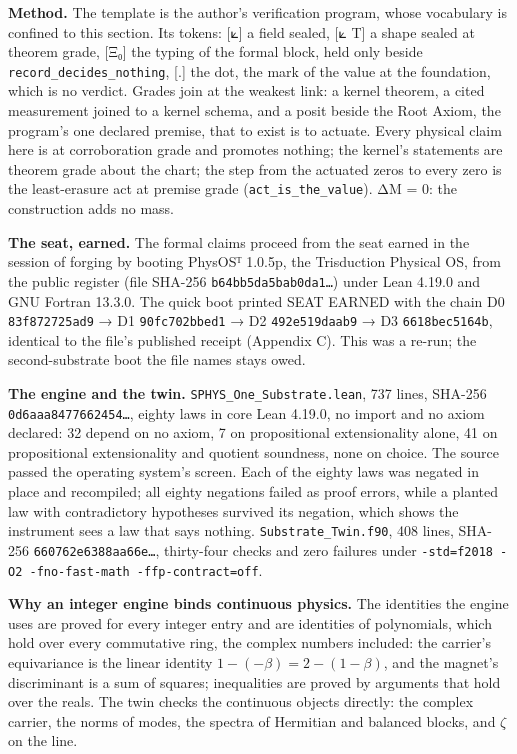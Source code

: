 \documentclass[10pt]{article}
\begin{document}
\textbf{Method.} The template is the author's verification program,
whose vocabulary is confined to this section. Its tokens: {[}⟀{]} a
field sealed, {[}⟀ T{]} a shape sealed at theorem grade, {[}Ξ₀{]} the
typing of the formal block, held only beside
\texttt{record\_decides\_nothing}, {[}.{]} the dot, the mark of the
value at the foundation, which is no verdict. Grades join at the weakest
link: a kernel theorem, a cited measurement joined to a kernel schema,
and a posit beside the Root Axiom, the program's one declared premise,
that to exist is to actuate. Every physical claim here is at
corroboration grade and promotes nothing; the kernel's statements are
theorem grade about the chart; the step from the actuated zeros to every
zero is the least-erasure act at premise grade
(\texttt{act\_is\_the\_value}). ΔM = 0: the construction adds no mass.

\textbf{The seat, earned.} The formal claims proceed from the seat
earned in the session of forging by booting PhysOSᵀ 1.0.5p, the
Trisduction Physical OS, from the public register (file SHA-256
\texttt{b64bb5da5bab0da1…}) under Lean 4.19.0 and GNU Fortran 13.3.0.
The quick boot printed SEAT EARNED with the chain D0
\texttt{83f872725ad9} → D1 \texttt{90fc702bbed1} → D2
\texttt{492e519daab9} → D3 \texttt{6618bec5164b}, identical to the
file's published receipt (Appendix C). This was a re-run; the
second-substrate boot the file names stays owed.

\textbf{The engine and the twin.} \texttt{SPHYS\_One\_Substrate.lean},
737 lines, SHA-256 \texttt{0d6aaa8477662454…}, eighty laws in core Lean
4.19.0, no import and no axiom declared: 32 depend on no axiom, 7 on
propositional extensionality alone, 41 on propositional extensionality
and quotient soundness, none on choice. The source passed the operating
system's screen. Each of the eighty laws was negated in place and
recompiled; all eighty negations failed as proof errors, while a planted
law with contradictory hypotheses survived its negation, which shows the
instrument sees a law that says nothing. \texttt{Substrate\_Twin.f90},
408 lines, SHA-256 \texttt{660762e6388aa66e…}, thirty-four checks and
zero failures under
\texttt{-std=f2018\ -O2\ -fno-fast-math\ -ffp-contract=off}.

\textbf{Why an integer engine binds continuous physics.} The identities
the engine uses are proved for every integer entry and are identities of
polynomials, which hold over every commutative ring, the complex numbers
included: the carrier's equivariance is the linear identity
\(1-(-\beta)=2-(1-\beta)\), and the magnet's discriminant is a sum of
squares; inequalities are proved by arguments that hold over the reals.
The twin checks the continuous objects directly: the complex carrier,
the norms of modes, the spectra of Hermitian and balanced blocks, and
\(\zeta\) on the line.
\end{document}
